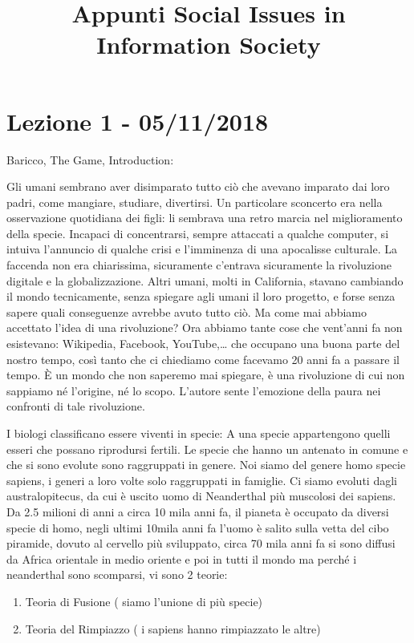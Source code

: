 \documentclass[]{article}
\title{Appunti Social Issues in Information Society}
\author{}
\date{}
\begin{document}
\maketitle
\tableofcontents

\section*{Lezione 1 - 05/11/2018}

Baricco, The Game, Introduction:

Gli umani sembrano aver disimparato tutto ciò che avevano imparato dai
loro padri, come mangiare, studiare, divertirsi. Un particolare
sconcerto era nella osservazione quotidiana dei figli: li sembrava una
retro marcia nel miglioramento della specie. Incapaci di concentrarsi,
sempre attaccati a qualche computer, si intuiva l'annuncio di qualche
crisi e l'imminenza di una apocalisse culturale. La faccenda non era
chiarissima, sicuramente c'entrava sicuramente la rivoluzione digitale e
la globalizzazione. Altri umani, molti in California, stavano cambiando
il mondo tecnicamente, senza spiegare agli umani il loro progetto, e
forse senza sapere quali conseguenze avrebbe avuto tutto ciò. Ma come
mai abbiamo accettato l'idea di una rivoluzione? Ora abbiamo tante cose
che vent'anni fa non esistevano: Wikipedia, Facebook, YouTube,\ldots{}
che occupano una buona parte del nostro tempo, così tanto che ci
chiediamo come facevamo 20 anni fa a passare il tempo. È un mondo che
non saperemo mai spiegare, è una rivoluzione di cui non sappiamo né
l'origine, né lo scopo. L'autore sente l'emozione della paura nei
confronti di tale rivoluzione.

I biologi classificano essere viventi in specie: A una specie
appartengono quelli esseri che possano riprodursi fertili. Le specie che
hanno un antenato in comune e che si sono evolute sono raggruppati in genere.
Noi siamo del genere homo specie sapiens, i generi a loro volte solo raggruppati
in famiglie. Ci siamo evoluti dagli australopitecus, da cui è uscito uomo
di Neanderthal più muscolosi dei sapiens. Da 2.5 milioni di anni a circa
10 mila anni fa, il pianeta è occupato da diversi specie di homo, negli
ultimi 10mila anni fa l'uomo è salito sulla vetta del cibo piramide,
dovuto al cervello più sviluppato, circa 70 mila anni fa si sono diffusi
da Africa orientale in medio oriente e poi in tutti il mondo ma perché i
neanderthal sono scomparsi, vi sono 2 teorie:

\begin{enumerate}
	\def\labelenumi{\arabic{enumi})}
	 
	\item
	Teoria di Fusione ( siamo l'unione di più specie)
	\item
	Teoria del Rimpiazzo ( i sapiens hanno rimpiazzato le altre)
\end{enumerate}
\end{document}
